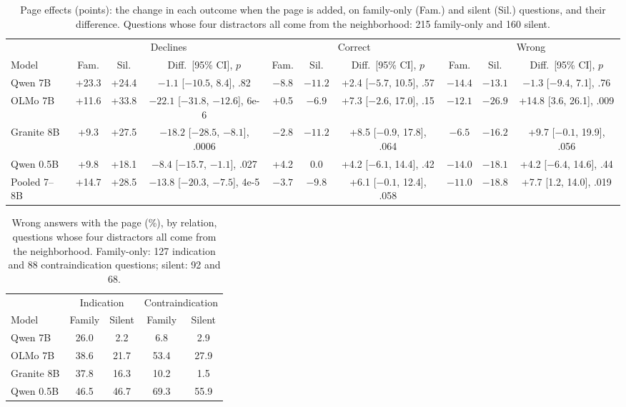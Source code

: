 \documentclass[letterpaper]{article} %
\begin{document}
\begin{table}[t]
\centering
\footnotesize
\setlength{\tabcolsep}{2.4pt}
\begin{tabular}{lccccccccc}
\toprule
 & \multicolumn{3}{c}{Declines} & \multicolumn{3}{c}{Correct} & \multicolumn{3}{c}{Wrong} \\
\cmidrule(lr){2-4}\cmidrule(lr){5-7}\cmidrule(lr){8-10}
Model & Fam. & Sil. & Diff.\ [95\% CI], $p$ & Fam. & Sil. & Diff.\ [95\% CI], $p$ & Fam. & Sil. & Diff.\ [95\% CI], $p$ \\
\midrule
Qwen 7B & +23.3 & +24.4 & $-1.1$ [$-10.5$, 8.4], .82 & $-8.8$ & $-11.2$ & +2.4 [$-5.7$, 10.5], .57 & $-14.4$ & $-13.1$ & $-1.3$ [$-9.4$, 7.1], .76 \\
OLMo 7B & +11.6 & +33.8 & $-22.1$ [$-31.8$, $-12.6$], 6e-6 & +0.5 & $-6.9$ & +7.3 [$-2.6$, 17.0], .15 & $-12.1$ & $-26.9$ & +14.8 [3.6, 26.1], .009 \\
Granite 8B & +9.3 & +27.5 & $-18.2$ [$-28.5$, $-8.1$], .0006 & $-2.8$ & $-11.2$ & +8.5 [$-0.9$, 17.8], .064 & $-6.5$ & $-16.2$ & +9.7 [$-0.1$, 19.9], .056 \\
Qwen 0.5B & +9.8 & +18.1 & $-8.4$ [$-15.7$, $-1.1$], .027 & +4.2 & 0.0 & +4.2 [$-6.1$, 14.4], .42 & $-14.0$ & $-18.1$ & +4.2 [$-6.4$, 14.6], .44 \\
\midrule
Pooled 7--8B & +14.7 & +28.5 & $-13.8$ [$-20.3$, $-7.5$], 4e-5 & $-3.7$ & $-9.8$ & +6.1 [$-0.1$, 12.4], .058 & $-11.0$ & $-18.8$ & +7.7 [1.2, 14.0], .019 \\
\bottomrule
\end{tabular}
\caption{Page effects (points): the change in each outcome when the page is
added, on family-only (Fam.) and silent (Sil.) questions, and their
difference. Questions whose four distractors all come from the neighborhood:
215 family-only and 160 silent.}
\label{tab:did_full}
\end{table}

\begin{table}[h]
\centering
\small
\setlength{\tabcolsep}{3pt}
\begin{tabular}{lcccc}
\toprule
 & \multicolumn{2}{c}{Indication} & \multicolumn{2}{c}{Contraindication} \\
\cmidrule(lr){2-3}\cmidrule(lr){4-5}
Model & Family & Silent & Family & Silent \\
\midrule
Qwen 7B & 26.0 & 2.2 & 6.8 & 2.9 \\
OLMo 7B & 38.6 & 21.7 & 53.4 & 27.9 \\
Granite 8B & 37.8 & 16.3 & 10.2 & 1.5 \\
Qwen 0.5B & 46.5 & 46.7 & 69.3 & 55.9 \\
\bottomrule
\end{tabular}
\caption{Wrong answers with the page (\%), by relation, questions whose four
distractors all come from the neighborhood. Family-only: 127 indication and 88
contraindication questions; silent: 92 and 68.}
\label{tab:byrel}
\end{table}
\end{document}

